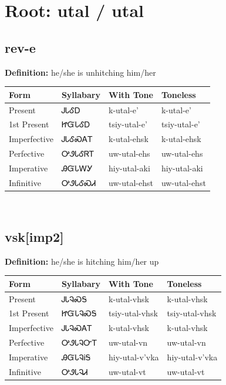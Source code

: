 \documentclass{article}%
\begin{document}
%
\normalsize%
\section*{Root: utal / utal}%
\subsection*{rev-e}%
\textbf{Definition: }%
he/she is unhitching him/her%
\\[0.5em]%
\begin{tabular}{|l|l|l|l|}%
\hline%
\textbf{Form}&\textbf{Syllabary}&\textbf{With Tone}&\textbf{Toneless}\\%
\hline%
Present&ᎫᏓᎴᎠ&k{-}utal{-}e'&k{-}utal{-}e'\\%
1st Present&ᏥᏳᏓᎴᎠ&tsiy{-}utal{-}e'&tsiy{-}utal{-}e'\\%
Imperfective&ᎫᏓᎴᏍᎪᎢ&k{-}utal{-}ehsk&k{-}utal{-}ehsk\\%
Perfective&ᎤᏭᏓᎴᏒᎢ&uw{-}utal{-}ehs&uw{-}utal{-}ehs\\%
Imperative&ᎯᏳᏓᎳᎩ&hiy{-}utal{-}aki&hiy{-}utal{-}aki\\%
Infinitive&ᎤᏭᏓᎴᏍᏗ&uw{-}utal{-}ehst&uw{-}utal{-}ehst\\%
\hline%
\end{tabular}%
\\[1em]%
\subsection*{vsk[imp2]}%
\textbf{Definition: }%
he/she is hitching him/her up%
\\[0.5em]%
\begin{tabular}{|l|l|l|l|}%
\hline%
\textbf{Form}&\textbf{Syllabary}&\textbf{With Tone}&\textbf{Toneless}\\%
\hline%
Present&ᎫᏓᎸᏍᎦ&k{-}utal{-}vhsk&k{-}utal{-}vhsk\\%
1st Present&ᏥᏳᏓᎸᏍᎦ&tsiy{-}utal{-}vhsk&tsiy{-}utal{-}vhsk\\%
Imperfective&ᎫᏓᎸᏍᎪᎢ&k{-}utal{-}vhsk&k{-}utal{-}vhsk\\%
Perfective&ᎤᏭᏓᎸᏅᎢ&uw{-}utal{-}vn&uw{-}utal{-}vn\\%
Imperative&ᎯᏳᏓᎸᎥᎦ&hiy{-}utal{-}v'vka&hiy{-}utal{-}v'vka\\%
Infinitive&ᎤᏭᏓᎸᏗ&uw{-}utal{-}vt&uw{-}utal{-}vt\\%
\hline%
\end{tabular}%
\\[1em]%
\end{document}
